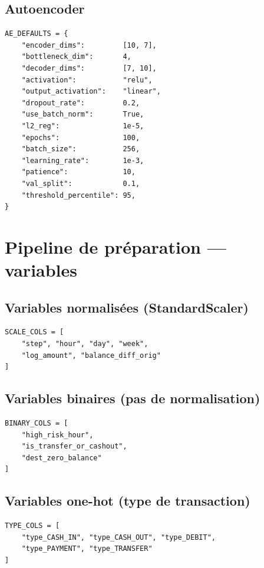 \documentclass[12pt,a4paper,twoside]{report}
\begin{document}
\section{Autoencoder}

\begin{lstlisting}[caption={Hyperparamètres AE (src/models/autoencoder.py)}]
AE_DEFAULTS = {
    "encoder_dims":         [10, 7],
    "bottleneck_dim":       4,
    "decoder_dims":         [7, 10],
    "activation":           "relu",
    "output_activation":    "linear",
    "dropout_rate":         0.2,
    "use_batch_norm":       True,
    "l2_reg":               1e-5,
    "epochs":               100,
    "batch_size":           256,
    "learning_rate":        1e-3,
    "patience":             10,
    "val_split":            0.1,
    "threshold_percentile": 95,
}
\end{lstlisting}

\chapter{Pipeline de préparation --- variables}

\section{Variables normalisées (StandardScaler)}

\begin{lstlisting}
SCALE_COLS = [
    "step", "hour", "day", "week",
    "log_amount", "balance_diff_orig"
]
\end{lstlisting}

\section{Variables binaires (pas de normalisation)}

\begin{lstlisting}
BINARY_COLS = [
    "high_risk_hour",
    "is_transfer_or_cashout",
    "dest_zero_balance"
]
\end{lstlisting}

\section{Variables one-hot (type de transaction)}

\begin{lstlisting}
TYPE_COLS = [
    "type_CASH_IN", "type_CASH_OUT", "type_DEBIT",
    "type_PAYMENT", "type_TRANSFER"
]
\end{lstlisting}
\end{document}
